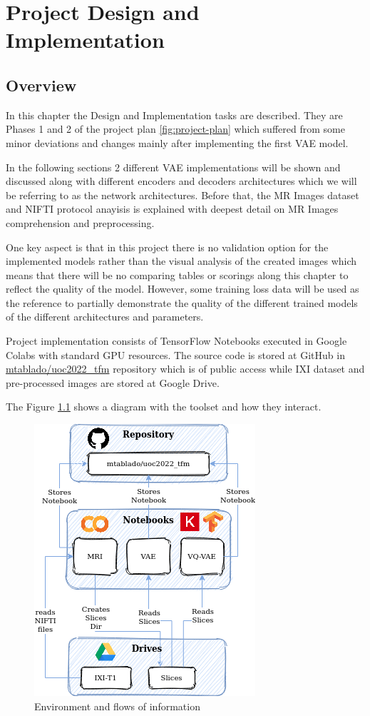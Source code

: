 \chapter{Project Design and Implementation}

\section{Overview}
\label{sec:imploverview}
In this chapter the Design and Implementation tasks are described. They are Phases 1 and 2 of the project plan \ref{fig:project-plan} which suffered from some minor deviations and changes mainly after implementing the first VAE model.

In the following sections 2 different VAE implementations will be shown and discussed along with different encoders and decoders architectures which we will be referring to as the network architectures. Before that, the MR Images dataset and NIFTI protocol anayisis is explained with deepest detail on MR Images comprehension and preprocessing.

One key aspect is that in this project there is no validation option for the implemented models rather than the visual analysis of the created images which means that there will be no comparing tables or scorings along this chapter to reflect the quality of the model. However, some  training loss data will be used as the reference to partially demonstrate the quality of the different trained models of the different architectures and parameters.   

Project implementation consists of TensorFlow Notebooks executed in Google Colabs with standard GPU resources. The source code is stored at GitHub in \href{https://github.com/mtablado/uoc2022_tfm}{mtablado/uoc2022\_tfm} repository which is of public access while IXI dataset and pre-processed images are stored at Google Drive.

The Figure \ref{fig:environment} shows a diagram with the toolset and how they interact.

\begin{figure}[ht]
    \centering
    \includegraphics[]{images/tfm-environment.png}
    \caption[Environment]{Environment and flows of information}
    \label{fig:environment}
\end{figure}

